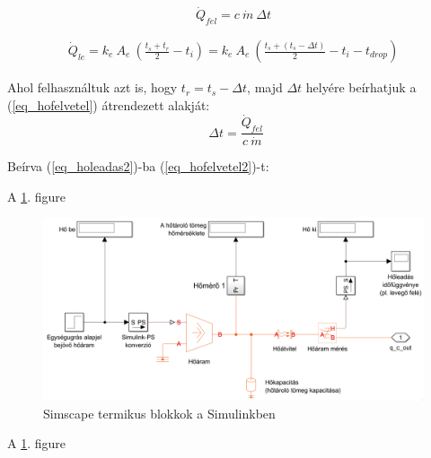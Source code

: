 \begin{equation} \label{eq_hofelvetel}
\dot Q_{fel} = c ~ \dot{m} ~ \Delta t
\end{equation}


\begin{equation} \label{eq_holeadas2}
\begin{aligned}
\dot Q_{le} = k_e ~ A_e ~ \left( \frac{t_s+t_r}{2}-t_i\right) = k_e ~ A_e ~ \left( \frac{t_s+(t_s-\Delta t)}{2}-t_i-t_{drop}\right)
\end{aligned}
\end{equation}

Ahol felhasználtuk azt is, hogy $t_r = t_s-\Delta t$, majd $\Delta t$ helyére beírhatjuk a (\ref{eq_hofelvetel})  átrendezett alakját:
\begin{equation} \label{eq_hofelvetel2}
~~\Delta t = \frac{\dot Q_{fel}}{c ~ \dot{m}}
\end{equation}

Beírva (\ref{eq_holeadas2})-ba (\ref{eq_hofelvetel2})-t:

A \ref{f}. figure

\begin{figure}
	\centering
	\includegraphics[width=\textwidth]{figures/SimscapeGeneral}
	\caption{Simscape termikus blokkok a Simulinkben}
	\label{f}
\end{figure}

A \ref{f}. figure